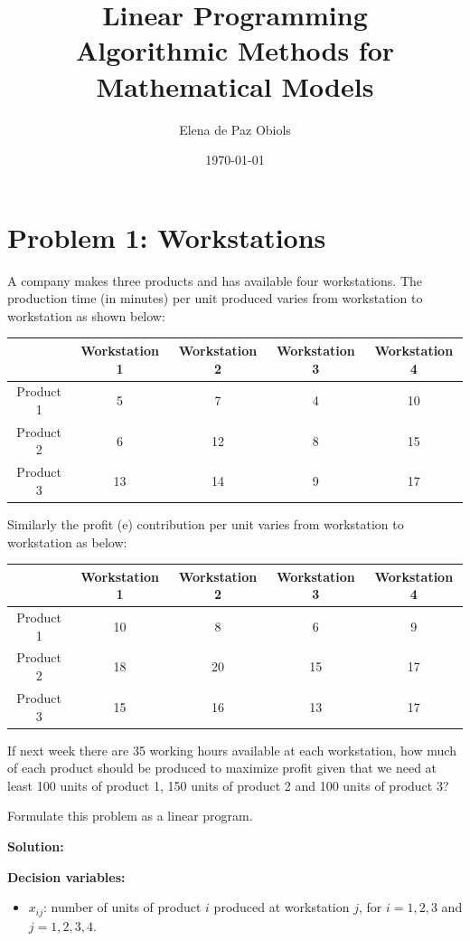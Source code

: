 \documentclass[a4paper,10pt]{article}
\title{Linear Programming\\Algorithmic Methods for Mathematical Models}
\author{Elena de Paz Obiols}
\date{\today}
\begin{document}
\maketitle

\section*{Problem 1: Workstations}

A company makes three products and has available four workstations. The production time (in
minutes) per unit produced varies from workstation to workstation as shown below:

\begin{table}[H]
\centering
\begin{tabular}{|c|c|c|c|c|}
\hline
& Workstation 1 & Workstation 2 & Workstation 3 & Workstation 4 \\
\hline
Product 1 & 5 & 7 & 4 & 10 \\
\hline
Product 2 & 6 & 12 & 8 & 15 \\
\hline
Product 3 & 13 & 14 & 9 & 17 \\
\hline
\end{tabular}
\end{table}

Similarly the profit (e) contribution per unit varies from workstation to workstation as below:

\begin{table}[H]
\centering
\begin{tabular}{|c|c|c|c|c|}
\hline
& Workstation 1 & Workstation 2 & Workstation 3 & Workstation 4 \\
\hline
Product 1 & 10 & 8 & 6 & 9 \\
\hline
Product 2 & 18 & 20 & 15 & 17 \\
\hline
Product 3 & 15 & 16 & 13 & 17 \\
\hline
\end{tabular}
\end{table}

If next week there are 35 working hours available at each workstation, how much of each product
should be produced to maximize profit given that we need at least 100 units of product 1, 150
units of product 2 and 100 units of product 3?

Formulate this problem as a linear program.


\medskip
\textbf{Solution:} 

\textbf{Decision variables:}

\begin{itemize}
    \item $x_{ij}$: number of units of product $i$ produced at workstation $j$, for $i=1,2,3$ and $j=1,2,3,4$.
\end{itemize}
\end{document}
